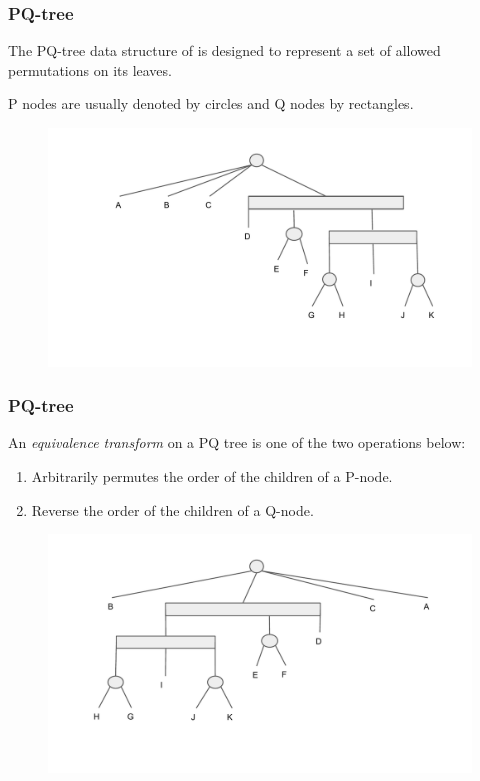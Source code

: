 \documentclass{beamer}
\begin{document}
\begin{frame}
	\frametitle{PQ-tree}
	\vspace{0.2in}
    The PQ-tree data structure of is designed to represent a set of allowed permutations on its leaves.
    
    \vspace{0.1in}
    
    P nodes are usually denoted by circles and Q nodes by rectangles.
	\begin{figure}
		\includegraphics[width = 1\textwidth]{figures/pqtree_1.pdf}
	\end{figure}
	
\vspace{0.2in}
\end{frame}

\begin{frame}
	\frametitle{PQ-tree}
	\vspace{0.2in}
    An \emph{equivalence transform} on a PQ tree is one of the two operations below:

    \begin{enumerate}
    \item Arbitrarily permutes the order of the children of a P-node.
    \item Reverse the order of the children of a Q-node.
    \end{enumerate}
	\begin{figure}
		\includegraphics[width = 1\textwidth]{figures/pqtree_2.pdf}
	\end{figure}
	
\vspace{0.2in}
\end{frame}
\end{document}
